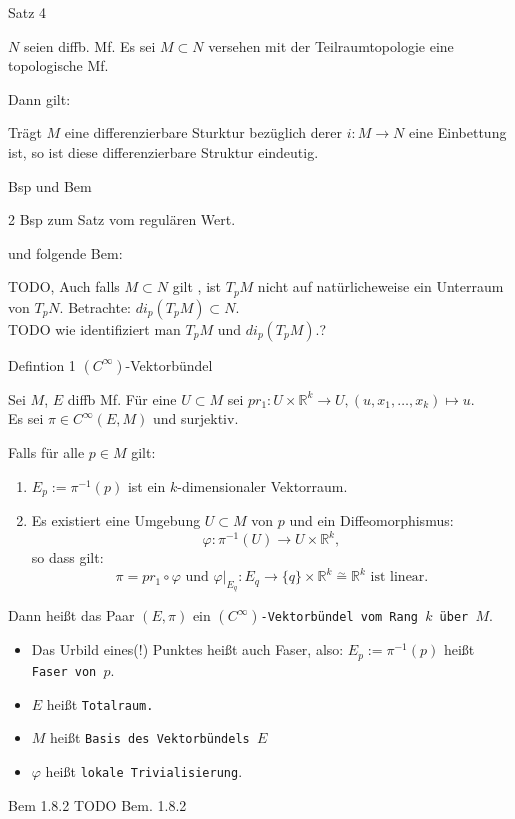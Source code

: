 \documentclass[a6paper,11pt,grid=front]{kartei}
\newcommand{\fl}[1]{\begin{flushleft}
 #1 \end{flushleft}}
\newcommand{\R}{\mathbb{R}}
\begin{document}
\nonameyet
{Satz 4} {}
{
$N$ seien diffb. Mf. Es sei $M \subset N$ versehen mit der Teilraumtopologie
eine topologische Mf.
\fl{Dann gilt:}
\fl{Trägt $M$ eine differenzierbare Sturktur bezüglich derer $i: M \to N$ eine 
		Einbettung ist, so ist diese differenzierbare Struktur eindeutig.}
}
{}

\nonameyet
{Bsp und Bem} {}
{
2 Bsp zum Satz vom regulären Wert.
\fl{und folgende Bem:}
TODO, Auch falls $M \subset N$ gilt , ist $T_pM$ nicht auf natürlicheweise
ein Unterraum von $T_pN$. 
Betrachte: $di_p(T_pM) \subset N$. 
\\
TODO wie identifiziert man $T_pM$ und $di_p(T_pM)$.?
}
{}


\nonameyet
{Defintion 1} {$(C^\infty)$-Vektorbündel}
{
\scriptsize
Sei $M$, $E$ diffb Mf. 
Für eine $U \subset M$ sei
$pr_1 : U \times \R^k \to U, (u,x_1,\dots,x_k) \mapsto u$.
\\
Es sei $\pi\in C^\infty(E,M)$ und surjektiv.
\fl{Falls für alle $p\in M$ gilt:}
\begin{enumerate}[1.]
\item $E_p := \pi^ {-1}(p)$ ist ein $k$-dimensionaler Vektorraum.  
\item Es existiert eine Umgebung $U\subset M$ von $p$ und ein 
Diffeomorphismus: 
\[
\varphi: \pi^ {-1}(U) \to U \times \R^k,
\]
so dass gilt:
\[
\pi = pr_1 \circ \varphi
\text{ und }
\varphi|_{E_q}: E_q \to \{ q\} \times \R^k \overset{\sim}{=} \R^k 
\text{ ist linear.}
\]
\end{enumerate}

\fl{Dann heißt das Paar $(E,\pi)$ ein \texttt{$(C^\infty)$-Vektorbündel vom 
Rang $k$ über $M$}.}

\tiny
\begin{itemize}[-]
\item Das Urbild eines(!) Punktes heißt auch Faser, also: 
$E_p := \pi^ {-1}(p)$ heißt \texttt{Faser von $p$}. 
\item $E$ heißt \texttt{Totalraum.}
\item $M$ heißt \texttt{Basis des Vektorbündels $E$}
\item $\varphi$ heißt \texttt{lokale Trivialisierung}.
\end{itemize}
}
{}
\nonameyet
{Bem 1.8.2} {}
{
TODO Bem. 1.8.2
}
{}
\end{document}
